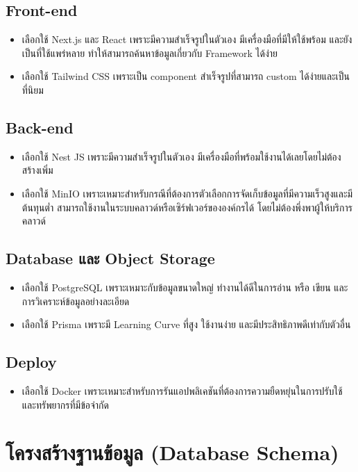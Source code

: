 \subsection{Front-end}
\begin{itemize}
\item เลือกใช้ Next.js และ React เพราะมีความสำเร็จรูปในตัวเอง มีเครื่องมือที่มีให้ใช้พร้อม และยังเป็นที่ใช้แพร่หลาย ทำให้สามารถค้นหาข้อมูลเกี่ยวกับ Framework ได้ง่าย
\item เลือกใช้ Tailwind CSS เพราะเป็น component สำเร็จรูปที่สามารถ custom ได้ง่ายและเป็นที่นิยม
\end{itemize}
\subsection{Back-end}
\begin{itemize}
\item เลือกใช้ Nest JS เพราะมีความสำเร็จรูปในตัวเอง มีเครื่องมือที่พร้อมใช้งานได้เลยโดยไม่ต้องสร้างเพิ่ม 
\item เลือกใช้ MinIO เพราะเหมาะสำหรับกรณีที่ต้องการตัวเลือกการจัดเก็บข้อมูลที่มีความเร็วสูงและมีต้นทุนต่ำ สามารถใช้งานในระบบคลาวด์หรือเซิร์ฟเวอร์ขององค์กรได้ โดยไม่ต้องพึ่งพาผู้ให้บริการคลาวด์
\end{itemize}
\newpage
\subsection{Database และ Object Storage}
\begin{itemize}
\item เลือกใช้ PostgreSQL เพราะเหมาะกับข้อมูลขนาดใหญ่ ทำงานได้ดีในการอ่าน หรือ เขียน และ การวิเคราะห์ข้อมูลอย่างละเอียด 
\item เลือกใช้ Prisma เพราะมี Learning Curve ที่สูง ใช้งานง่าย และมีประสิทธิภาพดีเท่ากับตัวอื่น
\end{itemize}
\subsection{Deploy}
\begin{itemize}
\item เลือกใช้ Docker เพราะเหมาะสำหรับการรันแอปพลิเคชันที่ต้องการความยืดหยุ่นในการปรับใช้และทรัพยากรที่มีข้อจำกัด 
\end{itemize}
\newpage
\section{โครงสร้างฐานข้อมูล (Database Schema)}

